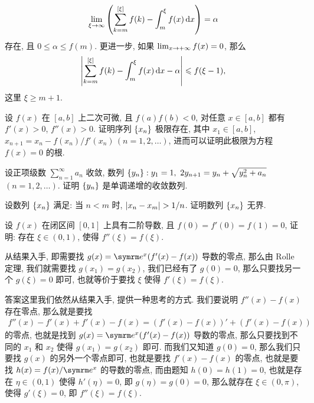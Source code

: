 \begin{exercise}[series=exer]
\begin{exercise}
\begin{align*}
            \lim_{\xi \to \infty} \qty(\sum_{k = m}^{[\xi]} f(k) - \int_{m}^{\xi} f(x) \dd{x}) = \alpha
        \end{align*}
        存在, 且 $ 0 \le \alpha \le f(m) $. 更进一步, 如果 $ \lim_{x \to +\infty} f(x) = 0 $, 那么
        \begin{align*}
            \abs{\sum_{k = m}^{[\xi]} f(k) - \int_{m}^{\xi} f(x) \dd{x} - \alpha} \leqslant f(\xi - 1),
        \end{align*} 
        这里 $ \xi \ge m + 1 $. 
    \end{exercise}
    \item 设 $ f(x) $ 在 $ [a, b] $ 上二次可微, 且 $ f(a)f(b) < 0 $, 对任意 $ x \in [a, b] $ 都有 $ f'(x) > 0 $, $ f''(x) > 0 $. 证明序列 $ \qty{x_{n}} $ 极限存在, 其中 $ x_{1} \in [a, b] $, $ x_{n + 1} = x_{n} - f(x_{n})/f'(x_{n})\,(n = 1, 2, \dots) $, 进而可以证明此极限为方程 $ f(x) = 0 $ 的根. 
    \item 设正项级数 $ \sum_{n = 1}^{\infty} a_{n} $ 收敛, 数列 $ \qty{y_{n}} : y_{1} = 1,\ 2y_{n + 1} = y_{n} + \sqrt{y_{n}^{2} + a_{n}} $\, $ (n = 1, 2, \dots) $. 证明 $ \qty{y_{n}} $ 是单调递增的收敛数列. 
    \item 设数列 $ \qty{x_{n}} $ 满足: 当 $ n < m $ 时, $ \abs{x_{n} - x_{m}} > 1/n $. 证明数列 $ \qty{x_{n}} $ 无界.
    \item 设 $ f(x) $ 在闭区间 $ [0, 1] $ 上具有二阶导数, 且 $ f(0) = f'(0) = f(1) = 0 $, 证明: 存在 $ \xi \in (0, 1) $, 使得 $ f''(\xi) = f(\xi) $.
    \begin{hint}
        从结果入手, 即需要找 $ g(x) = \me^{x}(f'(x) - f(x)) $ 导数的零点, 那么由 Rolle 定理, 我们就需要找 $ g(x_{1}) = g(x_{2}) $, 我们已经有了 $ g(0) = 0 $, 那么只要找另一个 $ g(\xi) = 0 $ 即可, 也就等价于要找 $ \xi $ 使得 $ f'(\xi) = f(\xi) $.
    \end{hint}
    \begin{answer}
        答案这里我们依然从结果入手, 提供一种思考的方式. 我们要说明 $ f''(x) - f(x) $ 存在零点, 那么就是要找
        \begin{align*}
            f''(x) - f'(x) + f'(x) - f(x) = (f'(x) - f(x))' + (f'(x) - f(x))
        \end{align*}
        的零点, 也就是找到 $ g(x) = \me^{x}(f'(x) - f(x)) $ 导数的零点, 那么只要找到不同的 $ x_{1} $ 和 $ x_{2} $ 使得 $ g(x_{1}) = g(x_{2}) $ 即可. 而我们又知道 $ g(0) = 0 $, 那么我们只要找 $ g(x) $ 的另外一个零点即可, 也就是要找 $ f'(x) - f(x) $ 的零点, 也就是要找 $ h(x) = f(x)/\me^{x} $ 的导数的零点, 而由题知 $ h(0) = h(1) = 0 $, 也就是存在 $ \eta\in(0, 1) $ 使得 $ h'(\eta) = 0 $, 即 $ g(\eta) = g(0) = 0 $, 那么就存在 $ \xi \in (0, \pi) $, 使得 $ g'(\xi) = 0 $, 即 $ f''(\xi) = f(\xi) $. 

\end{answer}
\end{exercise}
